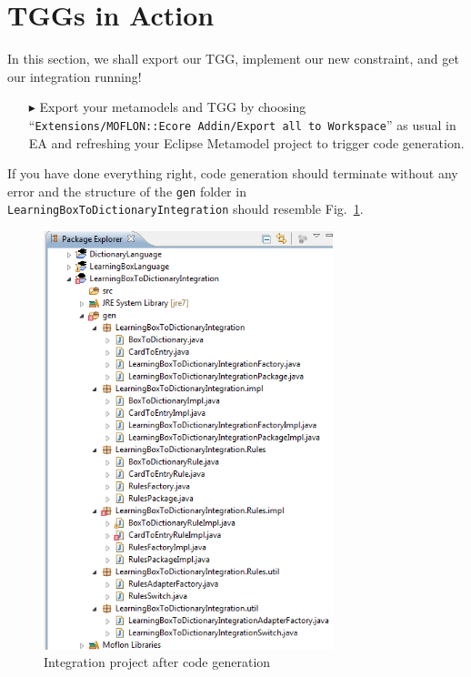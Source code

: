 \section{TGGs in Action}
In this section, we shall export our TGG, implement our new constraint, and get our integration running!
 
\begin{enumerate}
\item[$\blacktriangleright$] Export your metamodels and TGG by choosing ``\texttt{Extensions/\-MOFLON::\-Ecore Addin\-/Export all to Workspace}'' as usual in EA and refreshing your Eclipse Metamodel project to trigger code generation.
\end{enumerate}

If you have done everything right, code generation should terminate without any error and the structure of the \texttt{gen} folder in \texttt{LearningBox\-To\-Dictionary\-Integration} should resemble Fig.~\ref{fig:gen_folder}.

\begin{figure}[htbp]
\begin{center}
  \includegraphics[width=0.75\textwidth]{pics/tggBilder/transformation/tgg22}
  \caption{Integration project after code generation}  
  \label{fig:gen_folder}
\end{center}
\end{figure} 

